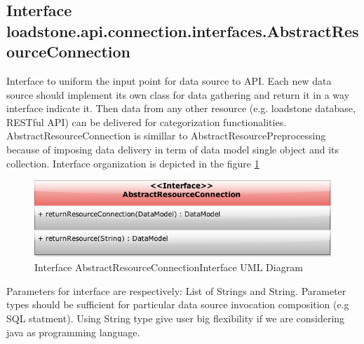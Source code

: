 \subsection{Interface \newline loadstone.api.connection.interfaces.AbstractResourceConnection}
Interface to uniform the input point for data source to API. Each new data source should implement its own class for data gathering and return it in a way interface indicate it. Then data from any other resource (e.g. loadstone database, RESTful API) can be delivered for categorization functionalities. AbstractResourceConnection is simillar to AbstractResourcePreprocessing because of imposing data delivery in term of data model single object and its collection. Interface organization is depicted in the figure \ref{fig:@=connection}   
\begin{figure}[h]
	\centering
	\includegraphics[scale=0.5]{Abstract_Resource_Connection_Interface.png}
	\caption{Interface AbstractResourceConnectionInterface UML Diagram}
	\label{fig:@=connection}
\end{figure}
Parameters for interface are respectively: List of Strings and String. Parameter types should be sufficient for particular data source invocation composition (e.g SQL statment). Using String type give user big flexibility if we are considering java as programming language.
